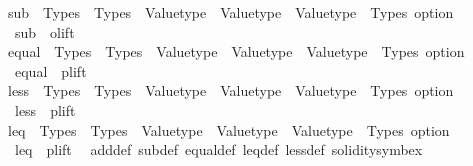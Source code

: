 \begin{isabellebody}
\isanewline
\isanewline
{}\isamarkupfalse%
\ sub\ {\isacharcolon}{\kern0pt}{\isacharcolon}{\kern0pt}\ {\isachardoublequoteopen}Types\ {\isasymRightarrow}\ Types\ {\isasymRightarrow}\ Valuetype\ {\isasymRightarrow}\ Valuetype\ {\isasymRightarrow}\ {\isacharparenleft}{\kern0pt}Valuetype\ {\isacharasterisk}{\kern0pt}\ Types{\isacharparenright}{\kern0pt}\ option{\isachardoublequoteclose}\isanewline
{}\isanewline
\ \ {\isachardoublequoteopen}sub\ {\isacharequal}{\kern0pt}\ olift\ {\isacharparenleft}{\kern0pt}{\isacharminus}{\kern0pt}{\isacharparenright}{\kern0pt}{\isachardoublequoteclose}\isanewline
\isanewline
\isanewline
{}\isamarkupfalse%
\ equal\ {\isacharcolon}{\kern0pt}{\isacharcolon}{\kern0pt}\ {\isachardoublequoteopen}Types\ {\isasymRightarrow}\ Types\ {\isasymRightarrow}\ Valuetype\ {\isasymRightarrow}\ Valuetype\ {\isasymRightarrow}\ {\isacharparenleft}{\kern0pt}Valuetype\ {\isacharasterisk}{\kern0pt}\ Types{\isacharparenright}{\kern0pt}\ option{\isachardoublequoteclose}\isanewline
{}\isanewline
\ \ {\isachardoublequoteopen}equal\ {\isacharequal}{\kern0pt}\ plift\ {\isacharparenleft}{\kern0pt}{\isacharequal}{\kern0pt}{\isacharparenright}{\kern0pt}{\isachardoublequoteclose}\isanewline
\isanewline
\isanewline
{}\isamarkupfalse%
\ less\ {\isacharcolon}{\kern0pt}{\isacharcolon}{\kern0pt}\ {\isachardoublequoteopen}Types\ {\isasymRightarrow}\ Types\ {\isasymRightarrow}\ Valuetype\ {\isasymRightarrow}\ Valuetype\ {\isasymRightarrow}\ {\isacharparenleft}{\kern0pt}Valuetype\ {\isacharasterisk}{\kern0pt}\ Types{\isacharparenright}{\kern0pt}\ option{\isachardoublequoteclose}\isanewline
{}\isanewline
\ \ {\isachardoublequoteopen}less\ {\isacharequal}{\kern0pt}\ plift\ {\isacharparenleft}{\kern0pt}{\isacharless}{\kern0pt}{\isacharparenright}{\kern0pt}{\isachardoublequoteclose}\isanewline
\isanewline
\isanewline
{}\isamarkupfalse%
\ leq\ {\isacharcolon}{\kern0pt}{\isacharcolon}{\kern0pt}\ {\isachardoublequoteopen}Types\ {\isasymRightarrow}\ Types\ {\isasymRightarrow}\ Valuetype\ {\isasymRightarrow}\ Valuetype\ {\isasymRightarrow}\ {\isacharparenleft}{\kern0pt}Valuetype\ {\isacharasterisk}{\kern0pt}\ Types{\isacharparenright}{\kern0pt}\ option{\isachardoublequoteclose}\isanewline
{}\isanewline
\ \ {\isachardoublequoteopen}leq\ {\isacharequal}{\kern0pt}\ plift\ {\isacharparenleft}{\kern0pt}{\isasymle}{\isacharparenright}{\kern0pt}{\isachardoublequoteclose}\isanewline
\isanewline
{}\isamarkupfalse%
\ add{\isacharunderscore}{\kern0pt}def\ sub{\isacharunderscore}{\kern0pt}def\ equal{\isacharunderscore}{\kern0pt}def\ leq{\isacharunderscore}{\kern0pt}def\ less{\isacharunderscore}{\kern0pt}def\ {\isacharbrackleft}{\kern0pt}solidity{\isacharunderscore}{\kern0pt}symbex{\isacharbrackright}{\kern0pt}\isanewline

\end{isabellebody}

